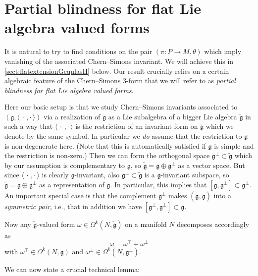 \documentclass[british,11pt,a4paper]{amsart}
\numberwithin{equation}{section}
\renewcommand\frak{\mathfrak}
\newcommand{\om}{\omega}
\newcommand{\Om}{\Omega}
\newcommand{\B}[2]{\langle#1,#2\rangle}
\newcommand{\col}{:}
\numberwithin{theorem}{section}
\theoremstyle{definition}
\theoremstyle{remark}
\begin{document}
\section{Partial blindness for flat Lie algebra valued forms}\label{sect:partialblindness}

It is natural to try to find conditions on the pair $(\pi \col P \to M,\theta)$ which  imply vanishing of the associated Chern--Simons invariant. We will achieve this in \cref{sect:flatextensionGequlasH} below. Our result crucially relies on a certain algebraic feature of the Chern--Simons $3$-form that we will refer to as \emph{partial blindness for flat Lie algebra valued forms}.

Here our basic setup is that we study Chern--Simons invariants associated to $(\frak{g},\B{\,\cdot\,}{\cdot\,})$ via a realization of $\frak{g}$ as a Lie subalgebra of a bigger Lie algebra $\tilde{\mathfrak{g}}$ in such a way that $\B{\,\cdot\,}{\cdot\,}$ is the restriction of an invariant form on $\tilde{\mathfrak{g}}$ which we denote by the same symbol. In particular we \textit{do} assume that the restriction to $\frak{g}$ is non-degenerate here. (Note that this is automatically satisfied if $\mathfrak{g}$ is simple and the restriction is non-zero.)
Then we can form the orthogonal space $\mathfrak{g}^\perp\subset\mathfrak{\tilde{g}}$
which by our assumption is complementary to $\mathfrak{g}$, so
$\mathfrak{\tilde{g}}=\mathfrak{g}\oplus\mathfrak{g}^\perp$ as a vector space. But
since $\B{\,\cdot\,}{\cdot\,}$ is clearly $\mathfrak{g}$-invariant, also $\frak
g^\perp\subset\mathfrak{\tilde{g}}$ is a $\mathfrak{g}$-invariant subspace, so
$\mathfrak{\tilde{g}}=\frak{g}\oplus\mathfrak{g}^\perp$ as a representation of
$\mathfrak{g}$. In particular, this implies that
$[\mathfrak{g},\mathfrak{g}^\perp]\subset\mathfrak{g}^\perp$. An important special
case is that the complement $\mathfrak{g}^\perp$ makes
$(\mathfrak{\tilde{g}},\mathfrak{g})$ into a \emph{symmetric pair}, i.e., that in
addition we have $[\mathfrak{g}^\perp,\mathfrak{g}^\perp]\subset\mathfrak{g}$.

Now any $\mathfrak{\tilde{g}}$-valued form $\om\in\Om^k(N,\mathfrak{\tilde{g}})$ on a
manifold $N$ decomposes accordingly as
\[
\om=\om^\top+\om^\perp
\] 
with $\om^\top\in\Om^k(N,\mathfrak{g})$ and
$\om^{\perp}\in\Om^k(N,\mathfrak{g}^\perp)$.



We can now state a crucial technical lemma:
\end{document}
